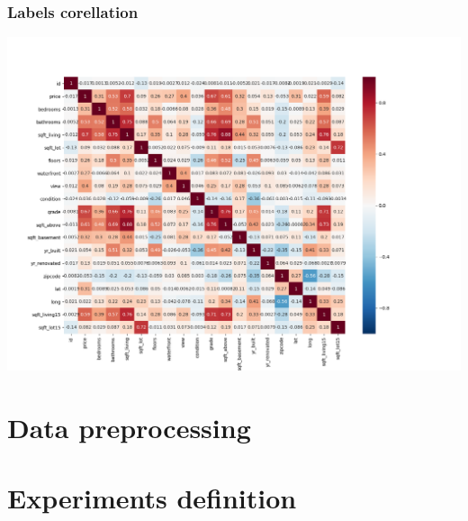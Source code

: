 \subsubsection{Labels corellation}
\begin{center}
	\includegraphics[width=1.2\textwidth, keepaspectratio]{diagrams/heatmap}
	\center
	\label{fig:heatmap}
\end{center}
\section{Data preprocessing} \label{sec:data-preprocessing}


\newpage
\section{Experiments definition}

